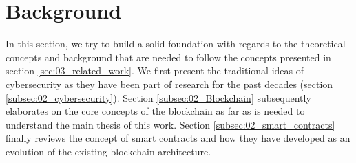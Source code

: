 \section{Background}
\label{sec:02_background}

In this section, we try to build a solid foundation with regards to the theoretical concepts and background that are needed to follow the concepts presented in section \ref{sec:03_related_work}. We first present the traditional ideas of cybersecurity as they have been part of research for the past decades (section \ref{subsec:02_cybersecurity}). Section \ref{subsec:02_Blockchain} subsequently elaborates on the core concepts of the blockchain as far as is needed to understand the main thesis of this work. Section \ref{subsec:02_smart_contracts} finally reviews the concept of smart contracts and how they have developed as an evolution of the existing blockchain architecture.





